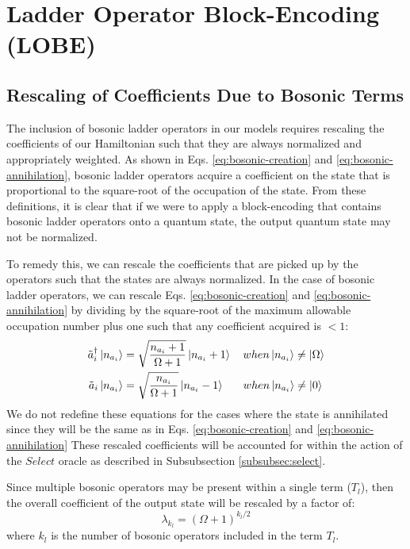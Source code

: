 \section{Ladder Operator Block-Encoding (LOBE)}
\label{sec:lobe}

\subsection{Rescaling of Coefficients Due to Bosonic Terms}
\label{subsec:rescaling}

The inclusion of bosonic ladder operators in our models requires rescaling the coefficients of our Hamiltonian such that they are always normalized and appropriately weighted.
As shown in Eqs. \ref{eq:bosonic-creation} and \ref{eq:bosonic-annihilation}, bosonic ladder operators acquire a coefficient on the state that is proportional to the square-root of the occupation of the state.
From these definitions, it is clear that if we were to apply a block-encoding that contains bosonic ladder operators onto a quantum state, the output quantum state may not be normalized.

To remedy this, we can rescale the coefficients that are picked up by the operators such that the states are always normalized.
In the case of bosonic ladder operators, we can rescale Eqs. \ref{eq:bosonic-creation} and \ref{eq:bosonic-annihilation} by dividing by the square-root of the maximum allowable occupation number plus one such that any coefficient acquired is $< 1$:
\begin{equation}
    \label{eq:bosonic-ops-altered}
    \begin{split}
        \Tilde{a}_i^\dagger \ket{n_{a_i}} &= \sqrt{\frac{n_{a_i} + 1}{\Omega + 1}} \ket{n_{a_i} + 1} \hspace{1em} when \ket{n_{a_i}} \neq \ket{\Omega} \\
        \Tilde{a}_i  \ket{n_{a_i}} &= \sqrt{\frac{n_{a_i}}{\Omega + 1}} \ket{n_{a_i} - 1} \hspace{1.7em} when \ket{n_{a_i}} \neq \ket{0}
    \end{split}
\end{equation}
We do not redefine these equations for the cases where the state is annihilated since they will be the same as in Eqs.  \ref{eq:bosonic-creation} and \ref{eq:bosonic-annihilation}
These rescaled coefficients will be accounted for within the action of the $Select$ oracle as described in Subsubsection \ref{subsubsec:select}.

Since multiple bosonic operators may be present within a single term ($T_l$), then the overall coefficient of the output state will be rescaled by a factor of:
\begin{equation}
    \lambda_{k_l} = (\Omega + 1)^{k_l/2}
\end{equation}
where $k_l$ is the number of bosonic operators included in the term $T_l$.

